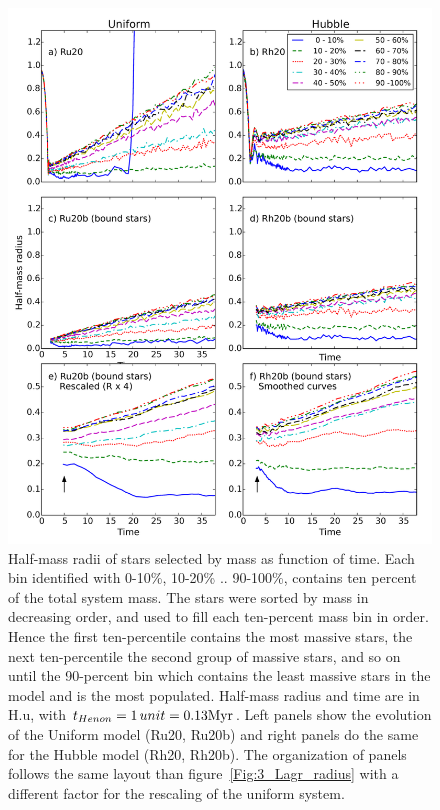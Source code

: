 \begin{figure}
\begin{center}
\includegraphics[width=\textwidth,clip=true]{Figures/3_Rhm_segr}
\caption[Mass segregation: half-mass radii over time for mass-selected stars]{Half-mass radii of stars selected by mass as function of time. Each bin identified with 0-10\%, 10-20\% .. 90-100\%, contains ten percent of the total system mass. The stars were sorted by mass in decreasing order, and used to fill each ten-percent mass bin in order. Hence the first ten-percentile contains the most massive stars, the next ten-percentile the second group of massive stars, and so on until the 90-percent bin which contains the least massive stars in the model and is the most populated. Half-mass radius and time are in H.u, with $t_{Henon} = 1\,unit = 0.13 {\textrm{Myr}}$. Left panels show the evolution of the Uniform model (Ru20, Ru20b) and right panels do the same for the Hubble model (Rh20, Rh20b). The organization of panels follows the same layout than figure~\ref{Fig:3_Lagr_radius} with a different factor for the rescaling of the uniform system. }
\label{Fig:3_Rhm_segr}
\end{center}
\end{figure}

